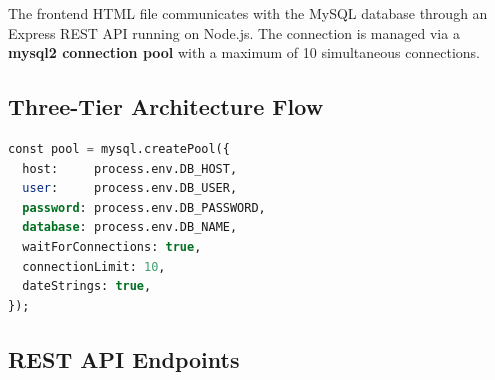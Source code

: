 \documentclass[12pt,a4paper]{report}
\begin{document}
The frontend HTML file communicates with the MySQL database through an Express REST API running on Node.js. The connection is managed via a \textbf{mysql2 connection pool} with a maximum of 10 simultaneous connections.

\subsection{Three-Tier Architecture Flow}

\begin{lstlisting}[language=SQL, caption={Connection pool configuration (server.js)}]
const pool = mysql.createPool({
  host:     process.env.DB_HOST,
  user:     process.env.DB_USER,
  password: process.env.DB_PASSWORD,
  database: process.env.DB_NAME,
  waitForConnections: true,
  connectionLimit: 10,
  dateStrings: true,
});
\end{lstlisting}

\subsection{REST API Endpoints}
\end{document}
